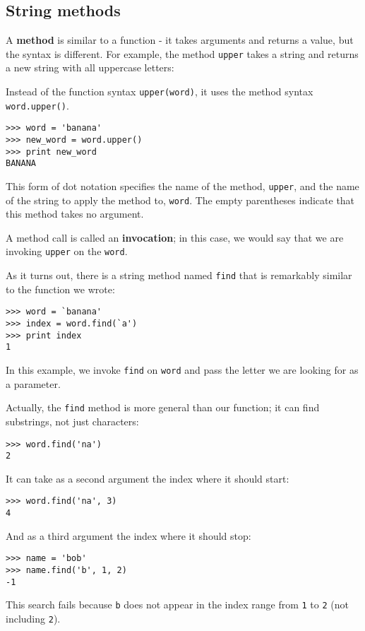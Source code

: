\documentclass{article}
\begin{document}
\subsection{String methods}
A \textbf{method} is similar to a function - it takes arguments and returns a
value, but the syntax is different. For example, the method
\verb|upper|
takes a string and returns a new string with all uppercase letters:
\par Instead of the function syntax \verb|upper(word)|,
it uses the method syntax \verb|word.upper()|.
\begin{lstlisting}
>>> word = 'banana'
>>> new_word = word.upper()
>>> print new_word
BANANA
\end{lstlisting}
\par This form of dot notation specifies the name of the method,
\verb|upper|, and the name of the string to apply the method to,
\verb|word|. The empty
parentheses indicate that this method takes no argument.
\par A method call is called an \textbf{invocation};
in this case, we would say that
we are invoking \verb|upper| on the \verb|word|.
\par As it turns out, there is a string method named \verb|find| that is
remarkably similar to the function we wrote:
\begin{lstlisting}
>>> word = `banana'
>>> index = word.find(`a')
>>> print index
1
\end{lstlisting}
\par In this example, we invoke \verb|find| on \verb|word|
and pass the letter we are looking for as a parameter.
\par Actually, the \verb|find| method is more general than our function; it can
find substrings, not just characters:
\begin{lstlisting}
>>> word.find('na')
2
\end{lstlisting}
\par It can take as a second argument the index where it should start:
\begin{lstlisting}
>>> word.find('na', 3)
4
\end{lstlisting}
\par And as a third argument the index where it should stop:
\begin{lstlisting}
>>> name = 'bob'
>>> name.find('b', 1, 2)
-1
\end{lstlisting}
\par This search fails because \verb|b| does not appear in the index range from
\verb|1| to \verb|2| (not including \verb|2|).
\end{document}
